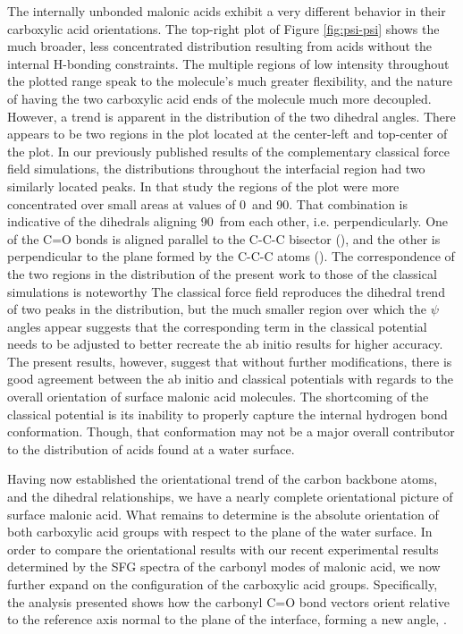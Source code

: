 The internally unbonded malonic acids exhibit a very different behavior in their carboxylic acid orientations. The top-right plot of Figure \ref{fig:psi-psi} shows the much broader, less concentrated distribution resulting from acids without the internal H-bonding constraints. The multiple regions of low intensity throughout the plotted range speak to the molecule's much greater flexibility, and the nature of having the two carboxylic acid ends of the molecule much more decoupled. However, a trend is apparent in the distribution of the two dihedral angles. There appears to be two regions in the plot located at the center-left and top-center of the plot. In our previously published results of the complementary classical force field simulations,\cite{Blower2012} the \psipsi distributions throughout the interfacial region had two similarly located peaks. In that study the regions of the plot were more concentrated over small areas at \psipsi values of 0\degr~and 90\degr. That combination is indicative of the dihedrals aligning 90\degr~from each other, i.e. perpendicularly. One of the C=O bonds is aligned parallel to the C-C-C bisector (\degr), and the other is perpendicular to the plane formed by the C-C-C atoms (\degr). The correspondence of the two regions in the distribution of the present work to those of the classical simulations is noteworthy The classical force field reproduces the dihedral trend of two peaks in the distribution, but the much smaller region over which the $\psi$ angles appear suggests that the corresponding term in the classical potential needs to be adjusted to better recreate the ab initio results for higher accuracy. The present results, however, suggest that without further modifications, there is good agreement between the ab initio and classical potentials with regards to the overall orientation of surface malonic acid molecules. The shortcoming of the classical potential is its inability to properly capture the internal hydrogen bond conformation. Though, that conformation may not be a major overall contributor to the distribution of acids found at a water surface.

Having now established the \thetaphi orientational trend of the carbon backbone atoms, and the \psipsi dihedral relationships, we have a nearly complete orientational picture of surface malonic acid. What remains to determine is the absolute orientation of both carboxylic acid groups with respect to the plane of the water surface. In order to compare the orientational results with our recent experimental results determined by the SFG spectra of the carbonyl modes of malonic acid,\cite{Blower2012} we now further expand on the configuration of the carboxylic acid groups. Specifically, the analysis presented shows how the carbonyl C=O bond vectors orient relative to the reference axis normal to the plane of the interface, forming a new angle, \thetacarb.

